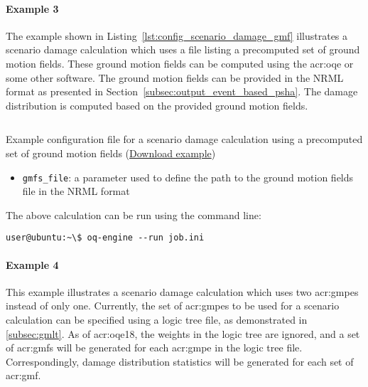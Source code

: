 \paragraph{Example 3}

The example shown in Listing~\ref{lst:config_scenario_damage_gmf} illustrates
a scenario damage calculation which uses a file listing a precomputed set of
ground motion fields. These ground motion fields can be computed using the
\glsdesc{acr:oqe} or some other software. The ground motion fields can be
provided in the NRML format as presented in
Section~\ref{subsec:output_event_based_psha}. The damage distribution is
computed based on the provided ground motion fields.

\begin{listing}[htbp]
  \inputminted[firstline=1,firstnumber=1,fontsize=\footnotesize,frame=single,linenos,bgcolor=lightgray,label=job.ini]{ini}{oqum/risk/verbatim/config_scenario_damage_gmf.ini}
  \caption{Example configuration file for a scenario damage calculation using a precomputed set of ground motion fields (\href{https://raw.githubusercontent.com/GEMScienceTools/oq-engine-docs/master/oqum/risk/verbatim/config_scenario_damage_gmf.xml}{Download example})}
  \label{lst:config_scenario_damage_gmf}
\end{listing}

\begin{itemize}

  \item \Verb+gmfs_file+: a parameter used to define the path
	  to the ground motion fields file in the NRML format

\end{itemize}

The above calculation can be run using the command line:

\begin{verbatim}
user@ubuntu:~\$ oq-engine --run job.ini
\end{verbatim}


\paragraph{Example 4}

This example illustrates a scenario damage calculation which uses two
\glspl{acr:gmpe} instead of only one. Currently, the set of \glspl{acr:gmpe}
to be used for a scenario calculation can be specified using a logic tree
file, as demonstrated in \ref{subsec:gmlt}. As of \glsdesc{acr:oqe18}, the
weights in the logic tree are ignored, and a set of \glspl{acr:gmf} will be
generated for each \gls{acr:gmpe} in the logic tree file. Correspondingly,
damage distribution statistics will be generated for each set of
\gls{acr:gmf}.


